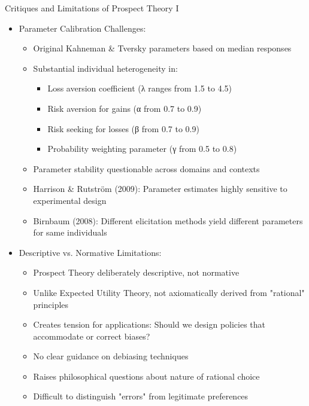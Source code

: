 \documentclass[10pt]{beamer}
\begin{document}
\begin{frame}{Critiques and Limitations of Prospect Theory I}
  \begin{itemize}[<+->]
    \item Parameter Calibration Challenges:
      \begin{itemize}
        \item Original Kahneman \& Tversky parameters based on median responses
        \item Substantial individual heterogeneity in:
          \begin{itemize}
            \item Loss aversion coefficient (λ ranges from 1.5 to 4.5)
            \item Risk aversion for gains (α from 0.7 to 0.9)
            \item Risk seeking for losses (β from 0.7 to 0.9)
            \item Probability weighting parameter (γ from 0.5 to 0.8)
          \end{itemize}
        \item Parameter stability questionable across domains and contexts
        \item Harrison \& Rutström (2009): Parameter estimates highly sensitive to experimental design
        \item Birnbaum (2008): Different elicitation methods yield different parameters for same individuals
      \end{itemize}
    \item Descriptive vs. Normative Limitations:
      \begin{itemize}
        \item Prospect Theory deliberately descriptive, not normative
        \item Unlike Expected Utility Theory, not axiomatically derived from "rational" principles
        \item Creates tension for applications: Should we design policies that accommodate or correct biases?
        \item No clear guidance on debiasing techniques
        \item Raises philosophical questions about nature of rational choice
        \item Difficult to distinguish "errors" from legitimate preferences
      \end{itemize}
  \end{itemize}
\end{frame}
\end{document}
